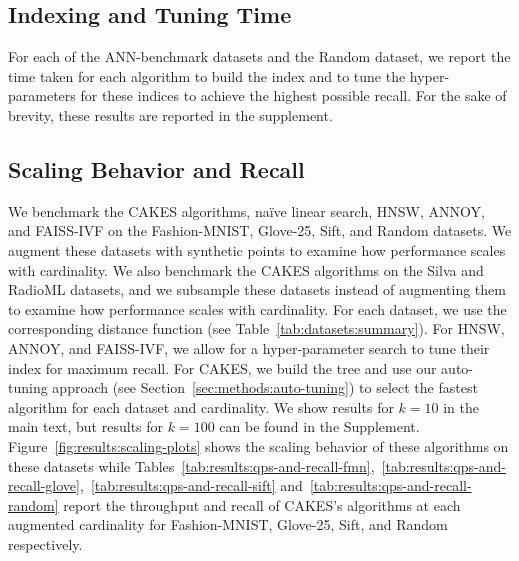 

\subsection{Indexing and Tuning Time}
\label{sec:results:indexing-and-tuning-time}

For each of the ANN-benchmark datasets and the Random dataset, we report the time taken for each algorithm to build the index and to tune the hyper-parameters for these indices to achieve the highest possible recall. For the sake of brevity, these results are reported in the supplement.


\subsection{Scaling Behavior and Recall}
\label{sec:results:scaling-behavior-and-recall}

We benchmark the CAKES algorithms, na\"{i}ve linear search, HNSW, ANNOY, and FAISS-IVF on the Fashion-MNIST, Glove-25, Sift, and Random datasets.
We augment these datasets with synthetic points to examine how performance scales with cardinality.
We also benchmark the CAKES algorithms on the Silva and RadioML datasets, and we subsample these datasets instead of augmenting them to examine how performance scales with cardinality.
For each dataset, we use the corresponding distance function (see Table~\ref{tab:datasets:summary}).
For HNSW, ANNOY, and FAISS-IVF, we allow for a hyper-parameter search to tune their index for maximum recall.
For CAKES, we build the tree and use our auto-tuning approach (see Section~\ref{sec:methods:auto-tuning}) to select the fastest algorithm for each dataset and cardinality.
We show results for $k=10$ in the main text, but results for $k=100$ can be found in the Supplement.
Figure~\ref{fig:results:scaling-plots} shows the scaling behavior of these algorithms on these datasets while Tables~\ref{tab:results:qps-and-recall-fmn},~\ref{tab:results:qps-and-recall-glove},~\ref{tab:results:qps-and-recall-sift} and~\ref{tab:results:qps-and-recall-random} report the throughput and recall of CAKES's algorithms at each augmented cardinality for Fashion-MNIST, Glove-25, Sift, and Random respectively.

